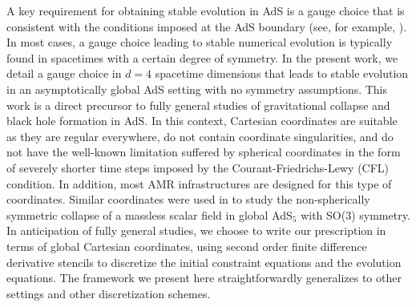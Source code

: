 \documentclass[a4paper,11pt]{article}
\numberwithin{equation}{section}
\begin{document}
A key requirement for obtaining stable evolution in AdS is a gauge choice that is consistent with the conditions imposed at the AdS boundary (see, for example, \cite{Bantilan:2012vu}).
In most cases, a gauge choice leading to stable numerical evolution is typically found in spacetimes with a certain degree of symmetry.
In the present work, we detail a gauge choice in $d=4$ spacetime dimensions that leads to stable evolution in an asymptotically global AdS setting with no symmetry assumptions.
This work is a direct precursor to fully general studies of gravitational collapse and black hole formation in AdS.
In this context, Cartesian coordinates are suitable as they are regular everywhere, do not contain coordinate singularities, and do not have the well-known limitation suffered by spherical coordinates in the form of severely shorter time steps imposed by the Courant-Friedrichs-Lewy (CFL) condition. In addition, most AMR infrastructures are designed for this type of coordinates. 
Similar coordinates were used in \cite{Bantilan:2017kok} to study the non-spherically symmetric collapse of a massless scalar field in global AdS$_5$ with SO(3) symmetry. 
In anticipation of fully general studies, we choose to write our prescription in terms of global Cartesian coordinates, using second order finite difference derivative stencils to discretize the initial constraint equations and the evolution equations. 
The framework we present here straightforwardly generalizes to other settings and other discretization schemes.
\end{document}
